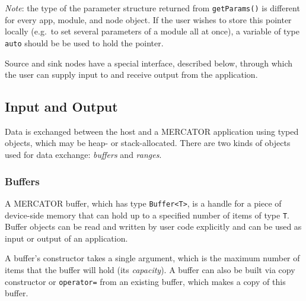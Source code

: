 \documentclass[11pt]{article}
\begin{document}
\textit{Note}: the type of the parameter structure returned from
\texttt{getParams()} is different for every app, module, and node
object.  If the user wishes to store this pointer locally (e.g.\ to
set several parameters of a module all at once), a variable of type
\texttt{auto} should be be used to hold the pointer.

Source and sink nodes have a special interface, described below,
through which the user can supply input to and receive output from the
application.

\subsection{Input and Output}

Data is exchanged between the host and a MERCATOR application using
typed objects, which may be heap- or stack-allocated.  There are two
kinds of objects used for data exchange: \textit{buffers} and
\textit{ranges}.

\subsubsection{Buffers}

A MERCATOR buffer, which has type \texttt{Buffer<T>}, is a handle for a
piece of device-side memory that can hold up to a specified number of
items of type \texttt{T}.  Buffer objects can be read and written
by user code explicitly and can be used as input or output of
an application.

A buffer's constructor takes a single argument, which is the maximum
number of items that the buffer will hold (its \textit{capacity}).  A
buffer can also be built via copy constructor or \texttt{operator=}
from an existing buffer, which makes a copy of this buffer.
\end{document}
